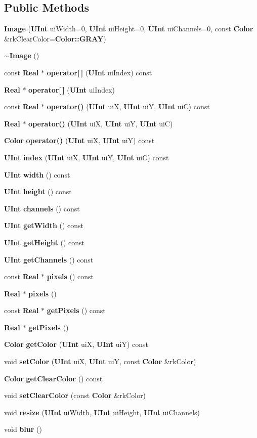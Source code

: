 \subsection*{Public Methods}
\begin{CompactItemize}
\item 
{\bf Image} ({\bf UInt} ui\-Width=0, {\bf UInt} ui\-Height=0, {\bf UInt} ui\-Channels=0, const {\bf Color} \&rk\-Clear\-Color={\bf Color::GRAY})
\item 
{\bf $\sim$Image} ()
\item 
const {\bf Real} $\ast$ {\bf operator[$\,$]} ({\bf UInt} ui\-Index) const
\item 
{\bf Real} $\ast$ {\bf operator[$\,$]} ({\bf UInt} ui\-Index)
\item 
const {\bf Real} $\ast$ {\bf operator()} ({\bf UInt} ui\-X, {\bf UInt} ui\-Y, {\bf UInt} ui\-C) const
\item 
{\bf Real} $\ast$ {\bf operator()} ({\bf UInt} ui\-X, {\bf UInt} ui\-Y, {\bf UInt} ui\-C)
\item 
{\bf Color} {\bf operator()} ({\bf UInt} ui\-X, {\bf UInt} ui\-Y) const
\item 
{\bf UInt} {\bf index} ({\bf UInt} ui\-X, {\bf UInt} ui\-Y, {\bf UInt} ui\-C) const
\item 
{\bf UInt} {\bf width} () const
\item 
{\bf UInt} {\bf height} () const
\item 
{\bf UInt} {\bf channels} () const
\item 
{\bf UInt} {\bf get\-Width} () const
\item 
{\bf UInt} {\bf get\-Height} () const
\item 
{\bf UInt} {\bf get\-Channels} () const
\item 
const {\bf Real} $\ast$ {\bf pixels} () const
\item 
{\bf Real} $\ast$ {\bf pixels} ()
\item 
const {\bf Real} $\ast$ {\bf get\-Pixels} () const
\item 
{\bf Real} $\ast$ {\bf get\-Pixels} ()
\item 
{\bf Color} {\bf get\-Color} ({\bf UInt} ui\-X, {\bf UInt} ui\-Y) const
\item 
void {\bf set\-Color} ({\bf UInt} ui\-X, {\bf UInt} ui\-Y, const {\bf Color} \&rk\-Color)
\item 
{\bf Color} {\bf get\-Clear\-Color} () const
\item 
void {\bf set\-Clear\-Color} (const {\bf Color} \&rk\-Color)
\item 
void {\bf resize} ({\bf UInt} ui\-Width, {\bf UInt} ui\-Height, {\bf UInt} ui\-Channels)
\item 
void {\bf blur} ()
\end{CompactItemize}


